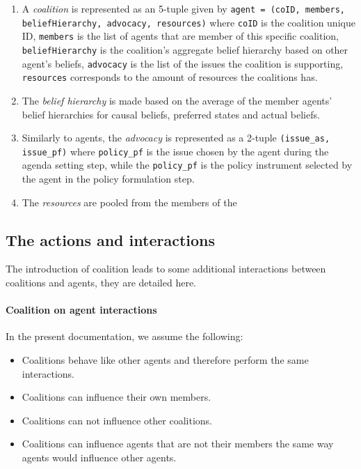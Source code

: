 \documentclass[11pt]{article}
\begin{document}
\begin{enumerate}

\item A \emph{coalition} is represented as an 5-tuple given by \texttt{agent = (coID, members, beliefHierarchy, advocacy, resources)} where
\texttt{coID} is the coalition unique ID,
\texttt{members} is the list of agents that are member of this specific coalition, 
\texttt{beliefHierarchy} is the coalition's aggregate belief hierarchy based on other agent's beliefs, 
\texttt{advocacy} is the list of the issues the coalition is supporting,
\texttt{resources} corresponds to the amount of resources the coalitions has.

\item The \emph{belief hierarchy} is made based on the average of the member agents' belief hierarchies for causal beliefs, preferred states and actual beliefs.

\item Similarly to agents, the \emph{advocacy} is represented as a 2-tuple \texttt{(issue\_as, issue\_pf)} where \texttt{policy\_pf} is the issue chosen by the agent during the agenda setting step, while the \texttt{policy\_pf} is the policy instrument selected by the agent in the policy formulation step.

\item The \emph{resources} are pooled from the members of the 

\end{enumerate}



\subsection{The actions and interactions}


The introduction of coalition leads to some additional interactions between coalitions and agents, they are detailed here.

\paragraph{Coalition on agent interactions}

In the present documentation, we assume the following:

\begin{itemize}
\item Coalitions behave like other agents and therefore perform the same interactions.
\item Coalitions can influence their own members.
\item Coalitions can not influence other coalitions.
\item Coalitions can influence agents that are not their members the same way agents would influence other agents.
\end{itemize}
\end{document}
